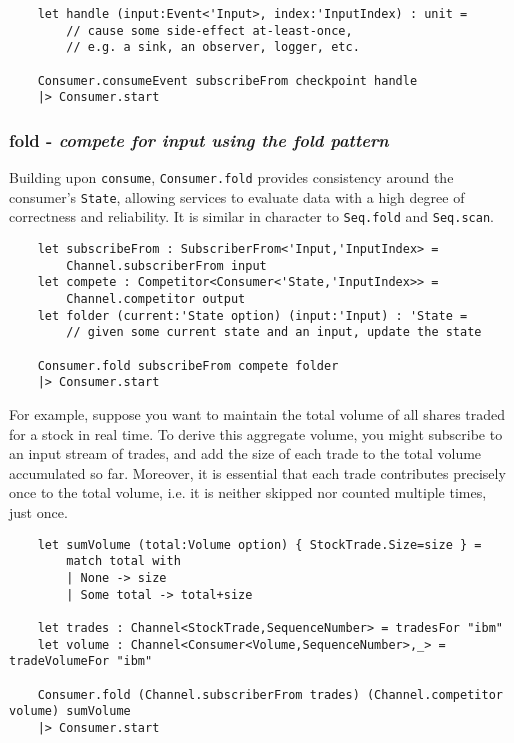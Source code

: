 \documentclass{article}
\begin{document}
\begin{verbatim}
    let handle (input:Event<'Input>, index:'InputIndex) : unit =
        // cause some side-effect at-least-once,
        // e.g. a sink, an observer, logger, etc.
    
    Consumer.consumeEvent subscribeFrom checkpoint handle
    |> Consumer.start
\end{verbatim}


\subsubsection{fold - \textit{compete for input using the fold pattern}}

Building upon  \texttt{consume}, \texttt{Consumer.fold} provides consistency around the consumer's \texttt{State}, allowing services to evaluate data with a high degree of correctness and reliability. It is similar in character to \texttt{Seq.fold} and \texttt{Seq.scan}.

\begin{verbatim}
    let subscribeFrom : SubscriberFrom<'Input,'InputIndex> =
        Channel.subscriberFrom input
    let compete : Competitor<Consumer<'State,'InputIndex>> =
        Channel.competitor output
    let folder (current:'State option) (input:'Input) : 'State =
        // given some current state and an input, update the state

    Consumer.fold subscribeFrom compete folder
    |> Consumer.start
\end{verbatim}

For example, suppose you want to maintain the total volume of all shares traded for a stock in real time.  To derive this aggregate volume, you might subscribe to an input stream of trades, and add the size of each trade to the total volume accumulated so far.  Moreover, it is essential that each trade contributes precisely once to the total volume, i.e. it is neither skipped nor counted multiple times, just once.

\begin{verbatim}
    let sumVolume (total:Volume option) { StockTrade.Size=size } =
        match total with
        | None -> size
        | Some total -> total+size

    let trades : Channel<StockTrade,SequenceNumber> = tradesFor "ibm"
    let volume : Channel<Consumer<Volume,SequenceNumber>,_> = tradeVolumeFor "ibm"
        
    Consumer.fold (Channel.subscriberFrom trades) (Channel.competitor volume) sumVolume
    |> Consumer.start
\end{verbatim}
\end{document}
